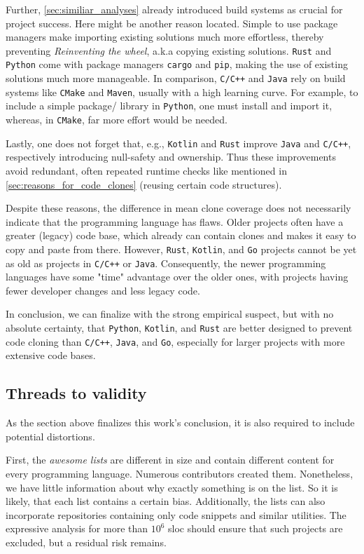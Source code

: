 Further, \autoref{sec:similiar_analyses} already introduced build systems as crucial for project success. Here might be another reason located. Simple to use package managers make importing existing solutions much more effortless, thereby preventing \textit{Reinventing the wheel}, a.k.a copying existing solutions. \texttt{Rust} and \texttt{Python} come with package managers \texttt{cargo} and \texttt{pip}, making the use of existing solutions much more manageable. In comparison, \texttt{C/C++} and \texttt{Java} rely on build systems like \texttt{CMake} and \texttt{Maven}, usually with a high learning curve. For example, to include a simple package/ library in \texttt{Python}, one must install and import it, whereas, in \texttt{CMake}, far more effort would be needed.

Lastly, one does not forget that, e.g., \texttt{Kotlin} and \texttt{Rust} improve \texttt{Java} and \texttt{C/C++}, respectively introducing null-safety and ownership. Thus these improvements avoid redundant, often repeated runtime checks like mentioned in \autoref{sec:reasons_for_code_clones} (reusing certain code structures).

Despite these reasons, the difference in mean clone coverage does not necessarily indicate that the programming language has flaws.
Older projects often have a greater (legacy) code base, which already can contain clones and makes it easy to copy and paste from there. 
However, \texttt{Rust}, \texttt{Kotlin}, and \texttt{Go} projects cannot be yet as old as projects in \texttt{C/C++} or \texttt{Java}. Consequently, the newer programming languages have some "time" advantage over the older ones, with projects having fewer developer changes and less legacy code.

In conclusion, we can finalize with the strong empirical suspect, but with no absolute certainty, that \texttt{Python}, \texttt{Kotlin}, and \texttt{Rust} are better designed to prevent code cloning than \texttt{C/C++}, \texttt{Java}, and \texttt{Go}, especially for larger projects with more extensive code bases.

 
\subsection{Threads to validity}

As the section above finalizes this work's conclusion, it is also required to include potential distortions.

First, the \textit{awesome lists} are different in size and contain different content for every programming language. Numerous contributors created them. Nonetheless, we have little information about why exactly something is on the list. So it is likely, that each list contains a certain bias. Additionally, the lists can also incorporate repositories containing only code snippets and similar utilities. The expressive analysis for more than $10^6$ \ac{sloc} should ensure that such projects are excluded, but a residual risk remains.

